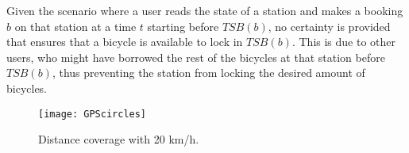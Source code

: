 \begin{description}[style=nextline]
Given the scenario where a user reads the state of a station and makes a booking $b$ on that station at a time $t$ starting before $TSB(b)$, no certainty is provided that ensures that a bicycle is available to lock in $TSB(b)$. 
This is due to other users, who might have borrowed the rest of the bicycles at that station before $TSB(b)$, thus preventing the station from locking the desired amount of bicycles.

\item[Problem 1.3]
\begin{figure}
	\centering
	\texttt{[image: GPScircles]}
	\caption{Distance coverage with 20 km/h.}
	\label{fig:gpsCircles}
\end{figure}
\end{description}

